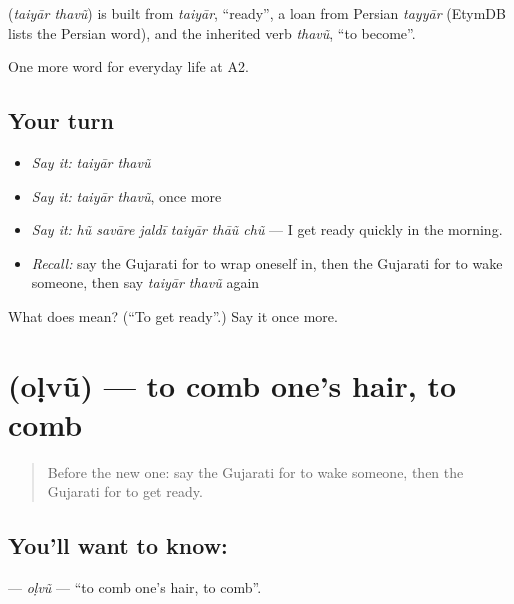 \begin{cousinweb}
\textbf{ } (\emph{taiyār thavũ}) is built from \emph{taiyār}, \textquotedblleft{}ready\textquotedblright{}, a loan from Persian \emph{tayyār} (EtymDB lists the Persian word), and the inherited verb \emph{thavũ}, \textquotedblleft{}to become\textquotedblright{}.
\end{cousinweb}

\begin{grammarlens}[title={What you've built}]
One more word for everyday life at A2.
\end{grammarlens}

\subsection*{Your turn}
\begin{itemize}
\raggedright
  \item \emph{Say it:} \emph{taiyār thavũ}
  \item \emph{Say it:} \emph{taiyār thavũ}, once more
  \item \emph{Say it:} \emph{hũ savāre jaldī taiyār thāũ chũ} — I get ready quickly in the morning.
  \item \emph{Recall:} say the Gujarati for to wrap oneself in, then the Gujarati for to wake someone, then say \emph{taiyār thavũ} again
\end{itemize}

\begin{tcolorbox}[breakable,colback=teal!4,colframe=teal!35!black,title={Before you move on}]
What does   mean? (\textquotedblleft{}To get ready\textquotedblright{}.) Say it once more.
\end{tcolorbox}
\section[\texorpdfstring{\gu{ઓળવું} (oḷvũ)}{ઓળવું (oḷvũ)}]{ (oḷvũ) — to comb one's hair, to comb}

\label{lesson:GU-C155-olvu}



\begin{quote}
Before the new one: say the Gujarati for to wake someone, then the Gujarati for to get ready.
\end{quote}

\subsection*{You'll want to know: }
\textbf{} — \emph{oḷvũ} — \textquotedblleft{}to comb one's hair, to comb\textquotedblright{}.

